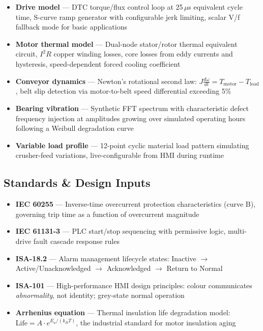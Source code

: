 \documentclass[9pt,a4paper,twocolumn,twoside]{tau-class/tau}
\begin{document}
\begin{itemize}
    \item \textbf{Drive model} — DTC torque/flux control loop at 25\,$\mu$s equivalent cycle time, S-curve ramp generator with configurable jerk limiting, scalar V/f fallback mode for basic applications
    \item \textbf{Motor thermal model} — Dual-node stator/rotor thermal equivalent circuit, $I^2R$ copper winding losses, core losses from eddy currents and hysteresis, speed-dependent forced cooling coefficient
    \item \textbf{Conveyor dynamics} — Newton's rotational second law: $J\frac{d\omega}{dt} = T_{\text{motor}} - T_{\text{load}}$, belt slip detection via motor-to-belt speed differential exceeding 5\%
    \item \textbf{Bearing vibration} — Synthetic FFT spectrum with characteristic defect frequency injection at amplitudes growing over simulated operating hours following a Weibull degradation curve
    \item \textbf{Variable load profile} — 12-point cyclic material load pattern simulating crusher-feed variations, live-configurable from HMI during runtime
\end{itemize}

\subsection{Standards \& Design Inputs}

\begin{itemize}
    \item \textbf{IEC 60255} — Inverse-time overcurrent protection characteristics (curve B), governing trip time as a function of overcurrent magnitude
    \item \textbf{IEC 61131-3} — PLC start/stop sequencing with permissive logic, multi-drive fault cascade response rules
    \item \textbf{ISA-18.2} — Alarm management lifecycle states: Inactive $\rightarrow$ Active/Unacknowledged $\rightarrow$ Acknowledged $\rightarrow$ Return to Normal
    \item \textbf{ISA-101} — High-performance HMI design principles: colour communicates \textit{abnormality}, not identity; grey-state normal operation
    \item \textbf{Arrhenius equation} — Thermal insulation life degradation model: $\text{Life} = A \cdot e^{E_a / (k_B T)}$, the industrial standard for motor insulation aging
\end{itemize}
\end{document}
